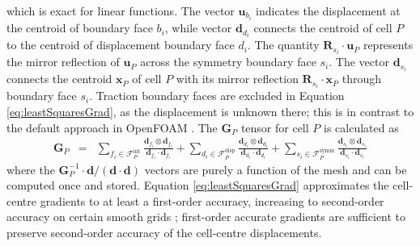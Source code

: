 \documentclass[sn-mathphys,Numbered]{sn-jnl}%
\newcommand{\bb}{\boldsymbol}
\begin{document}
which is exact for linear functions.
The vector $\bb{u}_{b_i}$ indicates the displacement at the centroid of boundary face ${b_i}$, while vector $\bb{d}_{d_i}$ connects the centroid of cell $P$ to the centroid of displacement boundary face $d_i$.
The quantity $\bb{R}_{s_i} \cdot \bb{u}_P$ represents the mirror reflection of $\bb{u}_P$ across the symmetry boundary face $s_i$.
The vector $\bb{d}_{s_i}$ connects the centroid $\bb{x}_P$ of cell $P$ with its mirror reflection $\bb{R}_{s_i}  \cdot \bb{x}_P$ through boundary face $s_i$.
Traction boundary faces are excluded in Equation \ref{eq:leastSquaresGrad}, as the displacement is unknown there; this is in contrast to the default approach in OpenFOAM \citep{Jasak2011}.
The $\bb{G}_P$ tensor for cell $P$ is calculated as
\begin{eqnarray}
	 \bb{G}_P &=&
	 \sum_{{f_i} \in \mathcal{F}^{\text{int}}_P} \frac{\bb{d}_{f_i} \otimes \bb{d}_{f_i}}{\bb{d}_{f_i} \cdot \bb{d}_{f_i}}
	 +  \sum_{{d_i} \in \mathcal{F}^{\text{disp}}_P} \frac{\bb{d}_{d_i} \otimes \bb{d}_{d_i}}{\bb{d}_{d_i} \cdot \bb{d}_{d_i}}
	 +  \sum_{{s_i} \in \mathcal{F}^{\text{symm}}_P} \frac{\bb{d}_{s_i} \otimes \bb{d}_{s_i}}{\bb{d}_{s_i} \cdot \bb{d}_{s_i}}
\end{eqnarray}
where the $\bb{G}^{-1}_P \cdot \bb{d}/(\bb{d}\cdot \bb{d})$ vectors are purely a function of the mesh and can be computed once and stored.
Equation \ref{eq:leastSquaresGrad} approximates the cell-centre gradients to at least a first-order accuracy, increasing to second-order accuracy on certain smooth grids \citep{Syrakos2023};
first-order accurate gradients are sufficient to preserve second-order accuracy of the cell-centre displacements.
\end{document}
